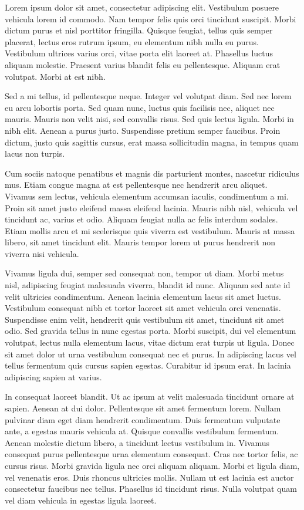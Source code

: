 Lorem ipsum dolor sit amet, consectetur adipiscing elit. Vestibulum posuere vehicula lorem id commodo. Nam tempor felis quis orci tincidunt suscipit. Morbi dictum purus et nisl porttitor fringilla. Quisque feugiat, tellus quis semper placerat, lectus eros rutrum ipsum, eu elementum nibh nulla eu purus. Vestibulum ultrices varius orci, vitae porta elit laoreet at. Phasellus luctus aliquam molestie. Praesent varius blandit felis eu pellentesque. Aliquam erat volutpat. Morbi at est nibh.

Sed a mi tellus, id pellentesque neque. Integer vel volutpat diam. Sed nec lorem eu arcu lobortis porta. Sed quam nunc, luctus quis facilisis nec, aliquet nec mauris. Mauris non velit nisi, sed convallis risus. Sed quis lectus ligula. Morbi in nibh elit. Aenean a purus justo. Suspendisse pretium semper faucibus. Proin dictum, justo quis sagittis cursus, erat massa sollicitudin magna, in tempus quam lacus non turpis.

Cum sociis natoque penatibus et magnis dis parturient montes, nascetur ridiculus mus. Etiam congue magna at est pellentesque nec hendrerit arcu aliquet. Vivamus sem lectus, vehicula elementum accumsan iaculis, condimentum a mi. Proin sit amet justo eleifend massa eleifend lacinia. Mauris nibh nisl, vehicula vel tincidunt ac, varius et odio. Aliquam feugiat nulla ac felis interdum sodales. Etiam mollis arcu et mi scelerisque quis viverra est vestibulum. Mauris at massa libero, sit amet tincidunt elit. Mauris tempor lorem ut purus hendrerit non viverra nisi vehicula.

Vivamus ligula dui, semper sed consequat non, tempor ut diam. Morbi metus nisl, adipiscing feugiat malesuada viverra, blandit id nunc. Aliquam sed ante id velit ultricies condimentum. Aenean lacinia elementum lacus sit amet luctus. Vestibulum consequat nibh et tortor laoreet sit amet vehicula orci venenatis. Suspendisse enim velit, hendrerit quis vestibulum sit amet, tincidunt sit amet odio. Sed gravida tellus in nunc egestas porta. Morbi suscipit, dui vel elementum volutpat, lectus nulla elementum lacus, vitae dictum erat turpis ut ligula. Donec sit amet dolor ut urna vestibulum consequat nec et purus. In adipiscing lacus vel tellus fermentum quis cursus sapien egestas. Curabitur id ipsum erat. In lacinia adipiscing sapien at varius.

In consequat laoreet blandit. Ut ac ipsum at velit malesuada tincidunt ornare at sapien. Aenean at dui dolor. Pellentesque sit amet fermentum lorem. Nullam pulvinar diam eget diam hendrerit condimentum. Duis fermentum vulputate ante, a egestas mauris vehicula at. Quisque convallis vestibulum fermentum. Aenean molestie dictum libero, a tincidunt lectus vestibulum in. Vivamus consequat purus pellentesque urna elementum consequat. Cras nec tortor felis, ac cursus risus. Morbi gravida ligula nec orci aliquam aliquam. Morbi et ligula diam, vel venenatis eros. Duis rhoncus ultricies mollis. Nullam ut est lacinia est auctor consectetur faucibus nec tellus. Phasellus id tincidunt risus. Nulla volutpat quam vel diam vehicula in egestas ligula laoreet. 

